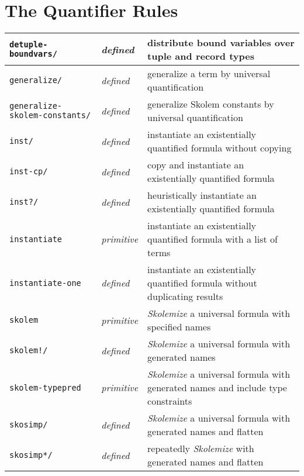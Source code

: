 \documentclass[12pt,twoside]{book}
\makeatletter
\newcommand{\indtt}[1]{\texttt{#1}\index{#1@{\texttt{#1}}}}  %
\newcommand{\indttdol}[1]{\texttt{#1/\char36}\index{#1@{\texttt{#1}}}} %
\newcommand{\indskobang}{\index{skolem"!@{\texttt{skolem"!}}}}
\newcommand{\skobangdol}{\texttt{skolem!/\char36}\indskobang}
\makeatother
\begin{document}

\section{The Quantifier Rules}

\begin{tabularx}{\textwidth}{|l|l|X|}\hline
\indttdol{detuple-boundvars} & \emph{defined}
  & distribute bound variables over tuple and record types \\\hline
\indttdol{generalize} & \emph{defined}
  & generalize a term by universal quantification \\\hline
\indttdol{generalize-skolem-constants} & \emph{defined}
  & generalize Skolem constants by universal quantification\\\hline
\indttdol{inst} & \emph{defined}
  & instantiate an existentially quantified formula without copying \\\hline
\indttdol{inst-cp} & \emph{defined}
  & copy and instantiate an existentially quantified formula \\\hline
\indttdol{inst?} & \emph{defined}
  & heuristically instantiate an existentially quantified formula \\\hline
\indtt{instantiate} & \emph{primitive}
  & instantiate an existentially quantified formula with a list of terms \\\hline
\indtt{instantiate-one} & \emph{defined}
  & instantiate an existentially quantified formula without duplicating results \\\hline
\indtt{skolem} & \emph{primitive}
  & \emph{Skolemize} a universal formula with specified names\\\hline
\skobangdol & \emph{defined}
  & \emph{Skolemize} a universal formula with generated names \\\hline
\indtt{skolem-typepred} & \emph{primitive}
  & \emph{Skolemize} a universal formula with generated names and include type constraints\\\hline
\indttdol{skosimp} & \emph{defined}
  & \emph{Skolemize} a universal formula with generated names and flatten \\\hline
\indttdol{skosimp*} & \emph{defined}
  & repeatedly \emph{Skolemize} with generated names and flatten \\\hline
\end{tabularx}
\end{document}
